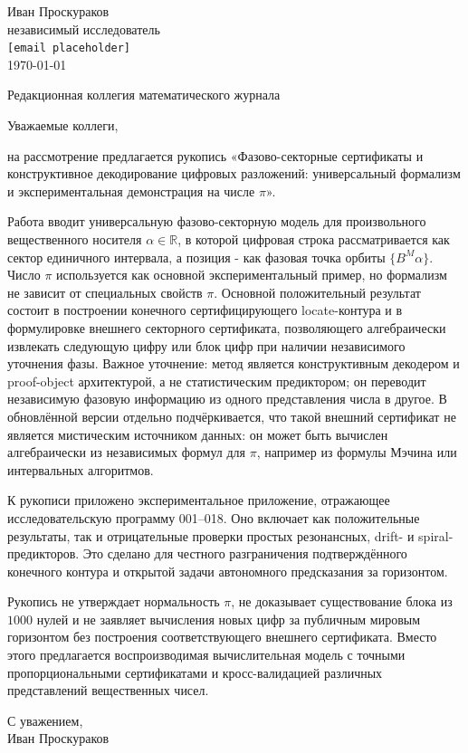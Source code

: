 \documentclass[11pt,a4paper]{article}
\begin{document}
\thispagestyle{empty}
\begin{flushright}
Иван Проскураков\\
независимый исследователь\\
\texttt{[email placeholder]}\\[1em]
\today
\end{flushright}

\vspace{2em}
\noindent Редакционная коллегия математического журнала

\vspace{1.5em}
\noindent Уважаемые коллеги,

\vspace{0.8em}
\noindent на рассмотрение предлагается рукопись «Фазово-секторные сертификаты и конструктивное декодирование цифровых разложений: универсальный формализм и экспериментальная демонстрация на числе $\pi$».

Работа вводит универсальную фазово-секторную модель для произвольного вещественного носителя $\alpha\in\mathbb R$, в которой цифровая строка рассматривается как сектор единичного интервала, а позиция - как фазовая точка орбиты $\{B^M\alpha\}$. Число $\pi$ используется как основной экспериментальный пример, но формализм не зависит от специальных свойств $\pi$. Основной положительный результат состоит в построении конечного сертифицирующего locate-контура и в формулировке внешнего секторного сертификата, позволяющего алгебраически извлекать следующую цифру или блок цифр при наличии независимого уточнения фазы.  Важное уточнение: метод является конструктивным декодером и proof-object архитектурой, а не статистическим предиктором; он переводит независимую фазовую информацию из одного представления числа в другое. В обновлённой версии отдельно подчёркивается, что такой внешний сертификат не является мистическим источником данных: он может быть вычислен алгебраически из независимых формул для $\pi$, например из формулы Мэчина или интервальных алгоритмов.

К рукописи приложено экспериментальное приложение, отражающее исследовательскую программу 001--018. Оно включает как положительные результаты, так и отрицательные проверки простых резонансных, drift- и spiral-предикторов. Это сделано для честного разграничения подтверждённого конечного контура и открытой задачи автономного предсказания за горизонтом.

Рукопись не утверждает нормальность $\pi$, не доказывает существование блока из $1000$ нулей и не заявляет вычисления новых цифр за публичным мировым горизонтом без построения соответствующего внешнего сертификата. Вместо этого предлагается воспроизводимая вычислительная модель с точными пропорциональными сертификатами и кросс-валидацией различных представлений вещественных чисел.

\vspace{2em}
\noindent С уважением,\\[1em]
Иван Проскураков
\end{document}
